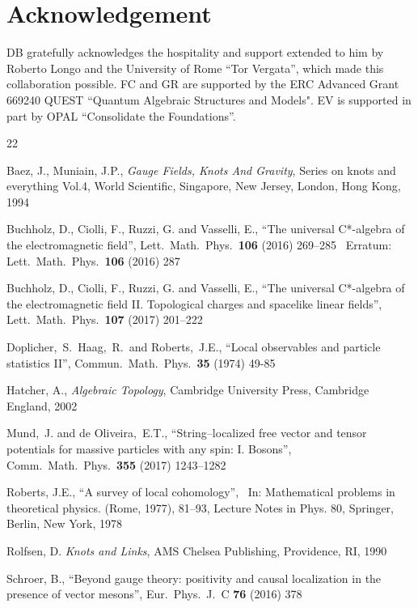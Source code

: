\documentclass[11pt]{article}
\numberwithin{equation}{section}
\begin{document}
\section*{Acknowledgement}

\vspace*{-2mm}
DB  gratefully acknowledges the hospitality and support 
extended to him by Roberto Longo and 
the University of Rome ``Tor Vergata'', which made
this collaboration possible. 
FC and GR are supported by the ERC Advanced Grant 
669240 QUEST ``Quantum Algebraic Structures and Models". 
EV is supported in part by OPAL ``Consolidate the Foundations''. 



\begin{thebibliography}{22}
{\small 

 Baez, J., Muniain, J.P., 
{\it Gauge Fields, Knots And Gravity},
Series on knots and everything Vol.4,
World Scientific, Singapore, New Jersey, London, Hong Kong, 1994

 Buchholz, D., Ciolli, F., Ruzzi, G. and Vasselli, E., 
``The universal C*-algebra of the electromagnetic field'',
Lett.\ Math.\ Phys.\ {\bf 106} (2016) 269--285 \ 
Erratum: Lett.\ Math.\ Phys.\ {\bf 106} (2016) 287

 Buchholz, D., Ciolli, F., Ruzzi, G. and Vasselli, E., 
``The universal C*-algebra of the electromagnetic field II.
Topological charges and spacelike linear fields'',
Lett.\ Math.\ Phys.\ {\bf 107} (2017) 201--222 \ 

 Doplicher,~S.\ Haag,~R.\ and Roberts,~J.E., 
``Local observables and particle statistics II'',
Commun.\ Math.\ Phys.\ {\bf 35} (1974) 49-85 

 Hatcher, A.,  
{\it Algebraic Topology}, 
Cambridge University Press, Cambridge England, 2002 

 Mund,~J. and de Oliveira,~E.T., 
``String–localized free vector and tensor potentials for
massive particles with any spin: I. Bosons'', 
Comm.\ Math.\ Phys.\ {\bf 355} (2017) 1243–1282 

 Roberts, J.E., 
``A survey of local cohomology'', \ 
In: Mathematical problems in theoretical physics. (Rome, 1977), 81--93, 
Lecture Notes in Phys. 80, Springer, Berlin, New York, 1978

Rolfsen, D. {\it Knots and Links},  
AMS Chelsea Publishing, Providence, RI, 1990 

Schroer, B., ``Beyond gauge theory: positivity and causal localization 
in the presence of vector mesons'', 
Eur.\ Phys.\ J.\ C \textbf{76} (2016) 378

}
\end{thebibliography}
\end{document}
